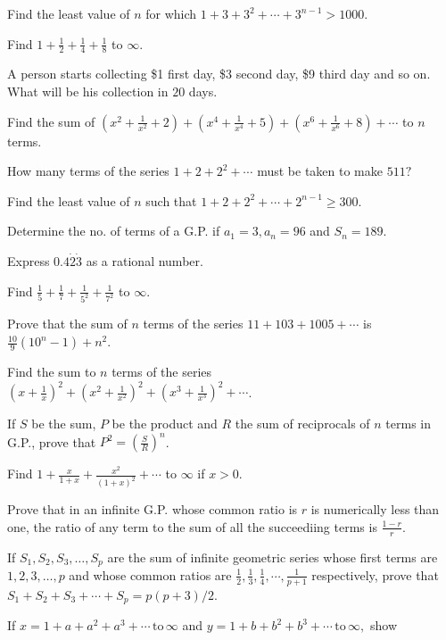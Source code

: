 \item Find the least value of $n$ for which $1 + 3 + 3^2 + \cdots + 3^{n - 1} > 1000$.
\item Find $1 + \frac{1}{2} + \frac{1}{4} + \frac{1}{8}$ to $\infty$.
\item A person starts collecting \$1 first day, \$3 second day, \$9 third day and so on. What will be his collection in $20$
  days.
\item Find the sum of $\left(x^2 + \frac{1}{x^2} + 2\right) + \left(x^4 + \frac{1}{x^4} + 5\right) + \left(x^6 + \frac{1}{x^6} +
  8\right) + \cdots$ to $n$ terms.
\item How many terms of the series $1 + 2 + 2^2 + \cdots$ must be taken to make $511?$
\item Find the least value of $n$ such that $1 + 2 + 2^2 + \cdots + 2^{n - 1} \geq 300$.
\item Determine the no. of terms of a G.P. if $a_1 = 3, a_n = 96$ and $S_n = 189$.
\item Express $0.4\dot{2}\dot{3}$ as a rational number.
\item Find $\frac{1}{5} + \frac{1}{7} + \frac{1}{5^2} + \frac{1}{7^2}$ to $\infty$.
\item Prove that the sum of $n$ terms of the series $11 + 103 + 1005+ \cdots$ is $\frac{10}{9}(10^n - 1) + n^2$.
\item Find the sum to $n$ terms of the series $\left(x + \frac{1}{x}\right)^2 + \left(x^2 + \frac{1}{x^2}\right)^2 + \left(x^3 +
  \frac{1}{x^3}\right)^2 + \cdots$.
\item If $S$ be the sum, $P$ be the product and $R$ the sum of reciprocals of $n$ terms in G.P., prove that $P^2 =
  \left(\frac{S}{R}\right)^n$.
\item Find $1 + \frac{x}{1 + x} + \frac{x^2}{(1 + x)^2} + \cdots$ to $\infty$ if $x > 0$.
\item Prove that in an infinite G.P. whose common ratio is $r$ is numerically less than one, the ratio of any term to the
  sum of all the succeediing terms is $\frac{1 - r}{r}$.
\item If $S_1, S_2, S_3, \ldots, S_p$ are the sum of infinite geometric series whose first terms are $1, 2, 3, \ldots, p$
  and whose common ratios are $\frac{1}{2}, \frac{1}{3}, \frac{1}{4}, \cdots, \frac{1}{p + 1}$ respectively, prove that $S_1 + S_2
  + S_3 + \cdots + S_p = p(p + 3)/2$.
\item If $x = 1 + a + a^2 + a^3 + \cdots\,\text{to}\,\infty$ and $y = 1 + b + b^2 + b^3 + \cdots\,\text{to}\,\infty,$ show

